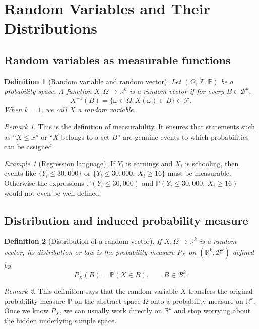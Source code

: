 \documentclass[11pt]{article}
\newtheorem{definition}{Definition}[section]
\theoremstyle{remark}
\newtheorem{remark}{Remark}[section]
\newtheorem{example}{Example}[section]
\newcommand{\R}{\mathbb{R}}
\newcommand{\PP}{\mathbb{P}}
\newcommand{\1}{\mathbbm{1}}
\newcommand{\cF}{\mathcal{F}}
\newcommand{\cB}{\mathcal{B}}
\begin{document}
\section{Random Variables and Their Distributions}

\subsection{Random variables as measurable functions}

\begin{definition}[Random variable and random vector]
Let \((\Omega,\cF,\PP)\) be a probability space. A function \(X:\Omega \to \R^k\) is a \emph{random vector} if for every \(B \in \cB^k\),
\[
  X^{-1}(B)=\{\omega \in \Omega : X(\omega)\in B\}\in \cF.
\]
When \(k=1\), we call \(X\) a \emph{random variable}.
\end{definition}

\begin{remark}
This is the definition of measurability. It ensures that statements such as ``\(X \le x\)'' or ``\(X\) belongs to a set \(B\)'' are genuine events to which probabilities can be assigned.
\end{remark}

\begin{example}[Regression language]
If \(Y_i\) is earnings and \(X_i\) is schooling, then events like \(\{Y_i \le 30{,}000\}\) or \(\{Y_i \le 30{,}000,\ X_i \ge 16\}\) must be measurable. Otherwise the expressions \(\PP(Y_i \le 30{,}000)\) and \(\PP(Y_i \le 30{,}000,\ X_i \ge 16)\) would not even be well-defined.
\end{example}

\subsection{Distribution and induced probability measure}

\begin{definition}[Distribution of a random vector]
If \(X:\Omega \to \R^k\) is a random vector, its \emph{distribution} or \emph{law} is the probability measure \(P_X\) on \((\R^k,\cB^k)\) defined by
\[
  P_X(B)=\PP(X\in B), \qquad B \in \cB^k.
\]
\end{definition}

\begin{remark}
This definition says that the random variable \(X\) transfers the original probability measure \(\PP\) on the abstract space \(\Omega\) onto a probability measure on \(\R^k\). Once we know \(P_X\), we can usually work directly on \(\R^k\) and stop worrying about the hidden underlying sample space.
\end{remark}
\end{document}
